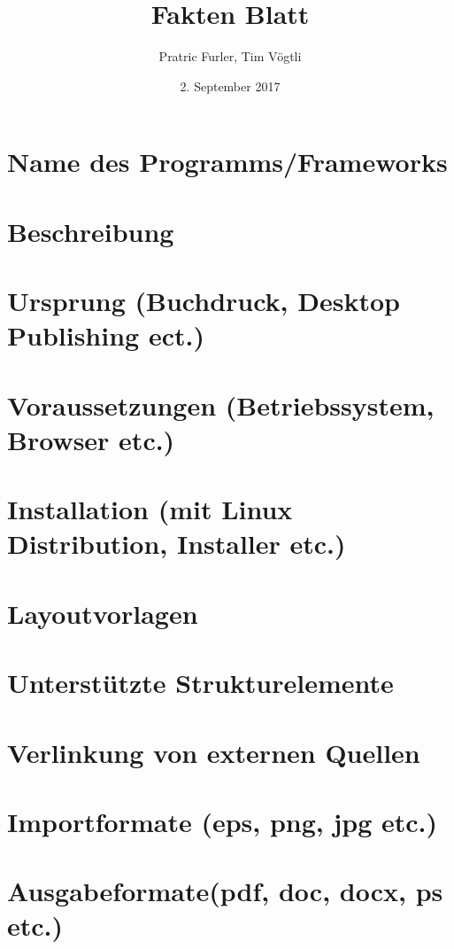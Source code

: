 \documentclass{scrartcl}
\title{Fakten Blatt}
\author{Pratric Furler, Tim Vögtli}
\date{2. September 2017}
\begin{document}
\maketitle

\section{Name des Programms/Frameworks}

\section{Beschreibung}

\section{Ursprung (Buchdruck, Desktop Publishing ect.)}

\section{Voraussetzungen (Betriebssystem, Browser etc.)}

\section{Installation (mit Linux Distribution, Installer etc.)}

\section{Layoutvorlagen}

\section{Unterstützte Strukturelemente}

\section{Verlinkung von externen Quellen}

\section{Importformate (eps, png, jpg etc.)}

\section{Ausgabeformate(pdf, doc, docx, ps etc.)}
\end{document}
